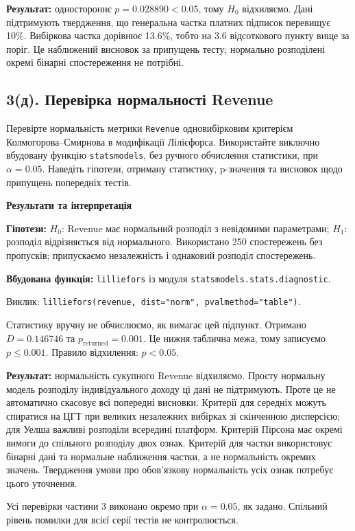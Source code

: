 \documentclass[11pt,a4paper]{article}
\newcommand{\pythoncode}[1]{%
  \Needspace{6\baselineskip}
  \begin{tcolorbox}[enhanced,breakable,colback=black!2!white,colframe=black!15!white,
    colbacktitle=black!6!white,coltitle=accent,fonttitle=\bfseries\small,
    title=Код Python,title after break={Код Python (продовження)},boxrule=0.4pt,arc=1mm,left=2mm,right=2mm,top=2mm,bottom=2mm,
    before skip=6pt,after skip=8pt]
  
  \end{tcolorbox}}
\newcommand{\answerheading}{\Needspace{4\baselineskip}\par\medskip
  {\color{answergreen}\bfseries Результати та інтерпретація}\par\smallskip}
\begin{document}
\textbf{Результат:} одностороннє \(p=0.028890<0.05\), тому \(H_0\) відхиляємо. Дані підтримують твердження, що генеральна частка платних підписок перевищує 10\%. Вибіркова частка дорівнює 13.6\%, тобто на 3.6 відсоткового пункту вище за поріг. Це наближений висновок за припущень тесту; нормально розподілені окремі бінарні спостереження не потрібні.
\clearpage
\subsection*{3(д). Перевірка нормальності Revenue}
\begin{taskstatement}
Перевірте нормальність метрики \texttt{Revenue} одновибірковим критерієм Колмогорова--Смирнова в модифікації Лілієфорса.
Використайте виключно вбудовану функцію \texttt{statsmodels}, без ручного обчислення статистики, при $\alpha=0.05$.
Наведіть гіпотези, отриману статистику, p-значення та висновок щодо припущень попередніх тестів.
\end{taskstatement}


\pythoncode{part3-cell16}
\answerheading
\textbf{Гіпотези:} \(H_0\): Revenue має нормальний розподіл з невідомими параметрами; \(H_1\): розподіл відрізняється від нормального. Використано 250 спостережень без пропусків; припускаємо незалежність і однаковий розподіл спостережень.

\textbf{Вбудована функція:} \texttt{lilliefors} із модуля \texttt{statsmodels.stats.diagnostic}.

Виклик: \texttt{lilliefors(revenue, dist="norm", pvalmethod="table")}.

Статистику вручну не обчислюємо, як вимагає цей підпункт. Отримано \(D=0.146746\) та \(p_{\mathrm{returned}}=0.001\). Це нижня таблична межа, тому записуємо \(p\le0.001\). Правило відхилення: \(p<0.05\).

\textbf{Результат:} нормальність сукупного Revenue відхиляємо. Просту нормальну модель розподілу індивідуального доходу ці дані не підтримують. Проте це не автоматично скасовує всі попередні висновки. Критерії для середніх можуть спиратися на ЦГТ при великих незалежних вибірках зі скінченною дисперсією; для Уелша важливі розподіли всередині платформ. Критерій Пірсона має окремі вимоги до спільного розподілу двох ознак. Критерій для частки використовує бінарні дані та нормальне наближення частки, а не нормальність окремих значень. Твердження умови про обов'язкову нормальність усіх ознак потребує цього уточнення.

Усі перевірки частини 3 виконано окремо при \(\alpha=0.05\), як задано. Спільний рівень помилки для всієї серії тестів не контролюється.
\end{document}
